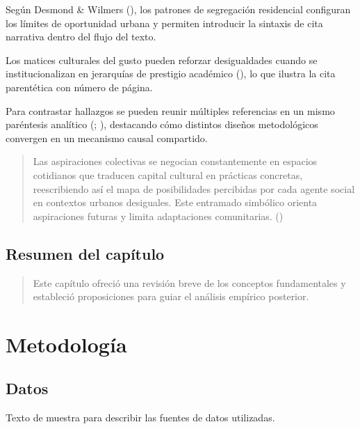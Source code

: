 \documentclass[
  spanish,
  a4paper,
  oneside]{scrbook}
\begin{document}
Según Desmond \& Wilmers (), los
patrones de segregación residencial configuran los límites de
oportunidad urbana y permiten introducir la sintaxis de cita narrativa
dentro del flujo del texto.

Los matices culturales del gusto pueden reforzar desigualdades cuando se
institucionalizan en jerarquías de prestigio académico
(), lo que ilustra la
cita parentética con número de página.

Para contrastar hallazgos se pueden reunir múltiples referencias en un
mismo paréntesis analítico (; ), destacando
cómo distintos diseños metodológicos convergen en un mecanismo causal
compartido.

\begin{quote}
Las aspiraciones colectivas se negocian constantemente en espacios
cotidianos que traducen capital cultural en prácticas concretas,
reescribiendo así el mapa de posibilidades percibidas por cada agente
social en contextos urbanos desiguales. Este entramado simbólico orienta
aspiraciones futuras y limita adaptaciones comunitarias.
()
\end{quote}

\section{Resumen del capítulo}\label{resumen-del-capuxedtulo}

\begin{quote}
Este capítulo ofreció una revisión breve de los conceptos fundamentales
y estableció proposiciones para guiar el análisis empírico posterior.
\end{quote}


\chapter{Metodología}\label{metodologuxeda}

\section{Datos}\label{datos}

Texto de muestra para describir las fuentes de datos utilizadas.
\end{document}
